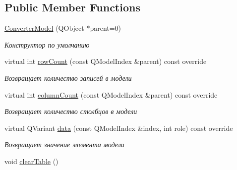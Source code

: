 \subsection*{Public Member Functions}
\begin{DoxyCompactItemize}
\item 
\hyperlink{classConverterModel_a03f3ce07fd6ab7c689ed79ff68008562}{Converter\+Model} (Q\+Object $\ast$parent=0)
\begin{DoxyCompactList}\small\item\em Конструктор по умолчанию \end{DoxyCompactList}\item 
virtual int \hyperlink{classConverterModel_a503b63db81bbc9f61fbdb4d042a9940b}{row\+Count} (const Q\+Model\+Index \&parent) const override
\begin{DoxyCompactList}\small\item\em Возвращает количество записей в модели \end{DoxyCompactList}\item 
virtual int \hyperlink{classConverterModel_ac86fe308aa90013c5b1ba3609efd2319}{column\+Count} (const Q\+Model\+Index \&parent) const override
\begin{DoxyCompactList}\small\item\em Возвращает количество столбцов в модели \end{DoxyCompactList}\item 
virtual Q\+Variant \hyperlink{classConverterModel_ac7293b25f07dc831e22fb830074b5625}{data} (const Q\+Model\+Index \&index, int role) const override
\begin{DoxyCompactList}\small\item\em Возвращает значение элемента модели \end{DoxyCompactList}\item 
void \hyperlink{classConverterModel_a85d10deabb8e07ff372be441cdca45e0}{clear\+Table} ()\hypertarget{classConverterModel_a85d10deabb8e07ff372be441cdca45e0}{}\label{classConverterModel_a85d10deabb8e07ff372be441cdca45e0}


\end{DoxyCompactItemize}
